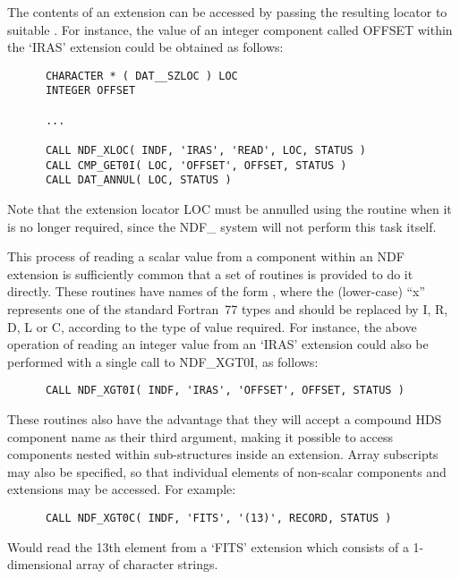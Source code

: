 The contents of an extension can be accessed by passing the resulting
locator to suitable .
For instance, the value of an integer component called OFFSET within the 
`IRAS' extension could be obtained as follows:

\small
\begin{verbatim}
      CHARACTER * ( DAT__SZLOC ) LOC
      INTEGER OFFSET

      ...

      CALL NDF_XLOC( INDF, 'IRAS', 'READ', LOC, STATUS )
      CALL CMP_GET0I( LOC, 'OFFSET', OFFSET, STATUS )
      CALL DAT_ANNUL( LOC, STATUS )
\end{verbatim}
\normalsize

Note that the extension locator LOC must be annulled using the routine
 when it is no longer required,
since the NDF\_ system will not perform this task itself.

This process of reading a scalar value from a component within an NDF
extension is sufficiently common that a set of routines is provided to do it
directly. 
These routines have names of the form , where the (lower-case)
``x'' represents one of the standard Fortran~77 types and should be replaced
by I, R, D, L or C, according to the type of value required. 
For instance, the above operation of reading an integer value from an `IRAS'
extension could also be performed with a single call to NDF\_XGT0I, as
follows: 

\small
\begin{verbatim}
      CALL NDF_XGT0I( INDF, 'IRAS', 'OFFSET', OFFSET, STATUS )
\end{verbatim}
\normalsize

These routines also have the advantage that they will accept a
compound HDS component name as their third argument, making it
possible to access components nested within sub-structures inside an
extension. Array subscripts may also be specified, so that individual
elements of non-scalar components and extensions may be accessed. For
example:

\small
\begin{verbatim}
      CALL NDF_XGT0C( INDF, 'FITS', '(13)', RECORD, STATUS )
\end{verbatim}
\normalsize

Would read the 13th element from a `FITS' extension which consists of
a 1-dimensional array of character strings.

